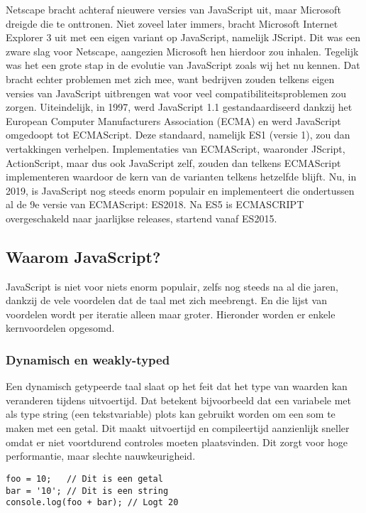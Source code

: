 Netscape bracht achteraf nieuwere versies van JavaScript uit, maar Microsoft dreigde die te onttronen. Niet zoveel later immers, bracht Microsoft Internet Explorer 3 uit met een eigen variant op JavaScript, namelijk JScript. Dit was een zware slag voor Netscape, aangezien Microsoft hen hierdoor zou inhalen. Tegelijk was het een grote stap in de evolutie van JavaScript zoals wij het nu kennen. Dat bracht echter problemen met zich mee, want bedrijven zouden telkens eigen versies van JavaScript uitbrengen wat voor veel compatibiliteitsproblemen zou zorgen. Uiteindelijk, in 1997, werd JavaScript 1.1 gestandaardiseerd dankzij het European Computer Manufacturers Association (ECMA) en werd JavaScript omgedoopt tot ECMAScript. \autocite{Wiley2016} Deze standaard, namelijk ES1 (versie 1), zou dan vertakkingen verhelpen. Implementaties van ECMAScript, waaronder JScript, ActionScript, maar dus ook JavaScript zelf, zouden dan telkens ECMAScript implementeren waardoor de kern van de varianten telkens hetzelfde blijft. Nu, in 2019, is JavaScript nog steeds enorm populair en implementeert die ondertussen al de 9e versie van ECMAScript: ES2018. Na ES5 is ECMASCRIPT overgeschakeld naar jaarlijkse releases, startend vanaf ES2015.

\subsection{Waarom JavaScript?}
\label{sec:jsWhy}

JavaScript is niet voor niets enorm populair, zelfs nog steeds na al die jaren, dankzij de vele voordelen dat de taal met zich meebrengt. En die lijst van voordelen wordt per iteratie alleen maar groter. Hieronder worden er enkele kernvoordelen opgesomd.

\subsubsection{Dynamisch en weakly-typed}
\label{sec:dynamic}

Een dynamisch getypeerde taal slaat op het feit dat het type van waarden kan veranderen tijdens uitvoertijd. Dat betekent bijvoorbeeld dat een variabele met als type string (een tekstvariable) plots kan gebruikt worden om een som te maken met een getal. Dit maakt uitvoertijd en compileertijd aanzienlijk sneller omdat er niet voortdurend controles moeten plaatsvinden. Dit zorgt voor hoge performantie, maar slechte nauwkeurigheid.

\begin{lstlisting}[style=ES6,
caption={Voorbeeld dynamisch getypeerde taal.},
label=code:dynamic]
foo = 10;	// Dit is een getal
bar = '10';	// Dit is een string
console.log(foo + bar); // Logt 20
\end{lstlisting}

